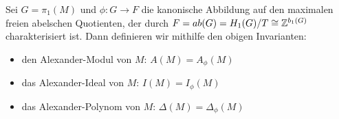         \begin{defn}
            Sei $G=\pi_1(M)$ und $\phi:G \to F$ die kanonische Abbildung auf den maximalen freien abelschen Quotienten, der durch $ F = ab(G) = H_1(G)/T \cong \mathbb{Z}^{b_1(G)}$ charakterisiert ist. Dann definieren wir mithilfe den obigen Invarianten:
            \begin{itemize}
                \item den Alexander-Modul von $M$: $A(M)=A_\phi(M)$
                \item das Alexander-Ideal von $M$: $I(M)=I_\phi(M)$
                \item das Alexander-Polynom von $M$: $\Delta(M)=\Delta_\phi(M)$ 
            \end{itemize}
        \end{defn}



